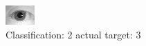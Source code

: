 \begin{figure}[h!]
\begin{center}
\includegraphics[width=0.60\columnwidth]{figures/ID1106_class_2_target_3.png}
\end{center}
\caption{ Classification: 2 actual target: 3}
\label{fig:ID1106_class_2_target_3}
\end{figure}
